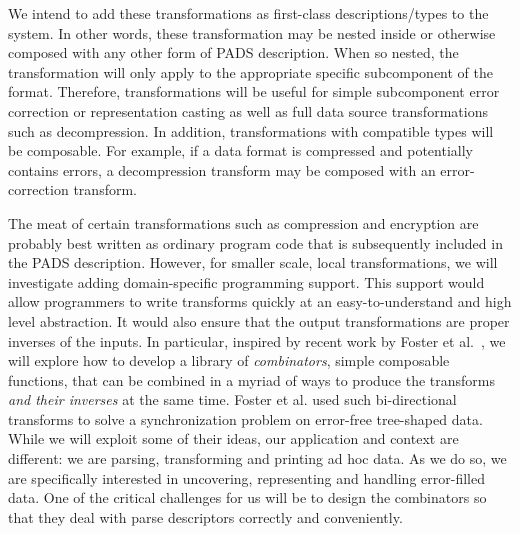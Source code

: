 \documentclass[11pt]{article}
\begin{document}
We intend to add these transformations as first-class
descriptions/types to the system.  In other words, these
transformation may be nested inside or otherwise composed with any
other form of PADS description.  When so nested, the transformation
will only apply to the appropriate specific subcomponent of the
format.  Therefore, transformations will be useful for simple
subcomponent error correction or representation casting as well as
full data source transformations such as decompression.  In addition,
transformations with compatible types will be composable.  For
example, if a data format is compressed and potentially contains
errors, a decompression transform may be composed with an
error-correction transform.

The meat of certain transformations such as compression and encryption
are probably best written as ordinary program code that is
subsequently included in the PADS description.  However, for smaller
scale, local transformations, we will investigate adding domain-specific
programming support.  This support would allow programmers to write
transforms quickly at an easy-to-understand and high level
abstraction.  It would also ensure that the output transformations are
proper inverses of the inputs.  In particular, inspired by recent work
by Foster et al.~\cite{foster+:lens}, we will explore how to develop a
library of {\em combinators}, simple composable functions, that can be
combined in a myriad of ways to produce the transforms {\em and their
inverses} at the same time.  Foster et al. used such bi-directional transforms to
solve a synchronization problem on error-free tree-shaped data. 
While we will exploit some of their
ideas, our application and
context are different: we are parsing, transforming and printing ad
hoc data.  As we do so, we are specifically interested in uncovering,
representing and handling error-filled data.  One of the critical
challenges for us will be to design the combinators so that they deal
with \pads{} parse descriptors correctly
and conveniently.
\end{document}
